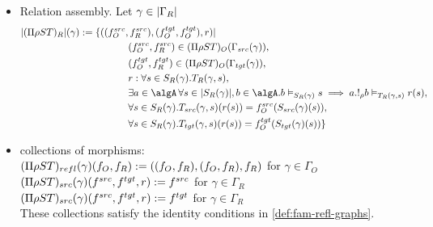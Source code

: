 \documentclass[12pt,a4paper]{article}
\def\src{_{src}}\alwaysmath{src}
\def\rfl{_{refl}}\alwaysmath{rfl}
\def\tgt{_{tgt}}\alwaysmath{tgt}
\renewcommand{\O}{_{O}}\alwaysmath{O}
\def\R{_{R}}\alwaysmath{R}
\begin{document}
\begin{itemize}[noitemsep]
   \item Relation assembly. Let $\gamma \in \carr{\Gamma\R}$
     \begin{align*}
       |(\Pi \rho S T)\R|(\gamma) \define \{( (f\O^{src},& \, f\R^{src}), (f\O^{tgt}, f\O^{tgt}), r)  | \\
       & (f\O^{src},f\R^{src}) \in (\Pi\rho S T)\O(\Gamma\src(\gamma)),\\
       & (f\O^{tgt},f\R^{tgt}) \in (\Pi\rho S T)\O(\Gamma\tgt(\gamma)),\\
       & r : \forall s \in S\R(\gamma). T\R(\gamma, s),\\
       & \exists a \in \algA\, \forall s \in \carr{S\R(\gamma)}, b \in \algA. b \vDash_{S\R(\gamma)} s \implies a . !_\rho b \vDash_{T\R(\gamma,s)} r(s),\\       
       & \forall s \in S\R(\gamma). T\src(\gamma, s)( r (s)) = f\O^{src}(S\src(\gamma)(s)),\\
       & \forall s \in S\R(\gamma). T\tgt(\gamma, s)( r (s)) = f\O^{tgt}(S\tgt(\gamma)(s)) \}
     \end{align*}
   \item collections of morphisms:\\
   $(\Pi \rho S T)\rfl(\gamma)(f\O, f\R) \define ((f\O, f\R), (f\O, f\R), f\R)$ for $\gamma \in \Gamma\O$\\
   $(\Pi \rho S T)\src(\gamma)(f^{src}, f^{tgt}, r) \define f^{src}$ for $\gamma \in \Gamma\R$ \\
   $(\Pi \rho S T)\src(\gamma)(f^{src}, f^{tgt}, r) \define f^{tgt}$ for $\gamma \in \Gamma\R$ \\
   These collections satisfy the identity conditions in \cref{def:fam-refl-graphs}.
\end{itemize}

\end{document}
